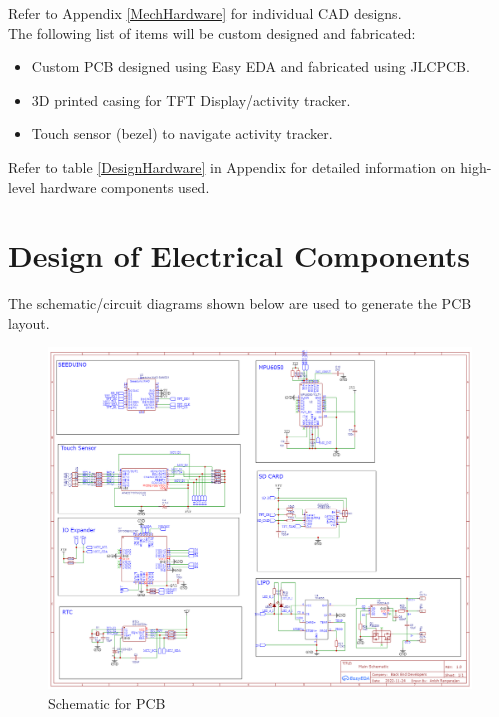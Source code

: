 \documentclass[12pt, titlepage]{article}
\begin{document}
Refer to Appendix \ref{MechHardware} for individual CAD designs.\\

The following list of items will be custom designed and fabricated:
\begin{itemize}
\item{Custom PCB designed using Easy EDA and fabricated using JLCPCB.}
\item{3D printed casing for TFT Display/activity tracker.}
\item{Touch sensor (bezel) to navigate activity tracker.}
\end{itemize}

Refer to table \ref{DesignHardware} in Appendix for detailed information on high-level hardware components used.



\section{Design of Electrical Components}

The schematic/circuit diagrams shown below are used to generate the PCB layout.

\begin{figure}[H]
	\begin{center}
		 \includegraphics[width=1\textwidth]{Schematic}
		\caption{Schematic for PCB}
		\label{Schematic} 
	\end{center}
\end{figure}
\end{document}
